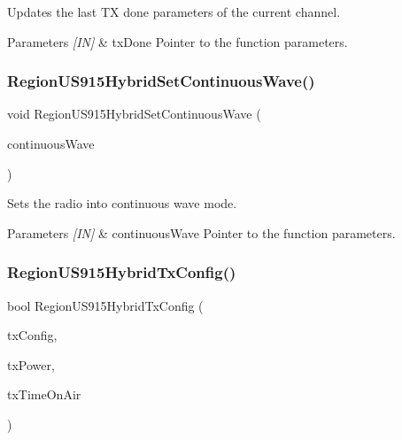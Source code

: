 Updates the last TX done parameters of the current channel. 


\begin{DoxyParams}{Parameters}
{\em \mbox{[}\+I\+N\mbox{]}} & tx\+Done Pointer to the function parameters. \\
\hline
\end{DoxyParams}
\mbox{\label{group__REGIONUS915HYB_gad7b0e2c75aff473cd0c4287d4c6f24d1}} 
\subsubsection{\texorpdfstring{Region\+U\+S915\+Hybrid\+Set\+Continuous\+Wave()}{RegionUS915HybridSetContinuousWave()}}
{\footnotesize\ttfamily void Region\+U\+S915\+Hybrid\+Set\+Continuous\+Wave (\begin{DoxyParamCaption}\item[{\hyperlink{group__REGION_gaf39bb5ba06921139c6d17f88a8d518cd}{Continuous\+Wave\+Params\+\_\+t} $\ast$}]{continuous\+Wave }\end{DoxyParamCaption})}



Sets the radio into continuous wave mode. 


\begin{DoxyParams}{Parameters}
{\em \mbox{[}\+I\+N\mbox{]}} & continuous\+Wave Pointer to the function parameters. \\
\hline
\end{DoxyParams}
\mbox{\label{group__REGIONUS915HYB_gaad87151c4921c1caae24b3b8bb4135b9}} 
\subsubsection{\texorpdfstring{Region\+U\+S915\+Hybrid\+Tx\+Config()}{RegionUS915HybridTxConfig()}}
{\footnotesize\ttfamily bool Region\+U\+S915\+Hybrid\+Tx\+Config (\begin{DoxyParamCaption}\item[{\hyperlink{group__REGION_gabed730d4d04b0b60d4b6d1966d3f21d3}{Tx\+Config\+Params\+\_\+t} $\ast$}]{tx\+Config,  }\item[{int8\+\_\+t $\ast$}]{tx\+Power,  }\item[{\hyperlink{utilities_8h_a4215ca43d3e953099ea758ce428599d0}{Timer\+Time\+\_\+t} $\ast$}]{tx\+Time\+On\+Air }\end{DoxyParamCaption})}



